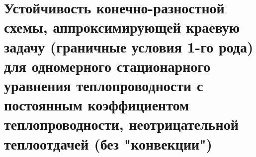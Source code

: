 \documentclass[__main__.tex]{subfiles}
\begin{document}
\section{Устойчивость конечно-разностной схемы, аппроксимирующей краевую задачу (граничные условия 1-го рода) для одномерного стационарного уравнения теплопроводности с постоянным коэффициентом теплопроводности, неотрицательной теплоотдачей (без "конвекции")}
\end{document}
